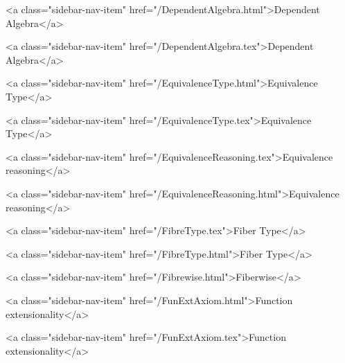       
    
      
        
          <a class="sidebar-nav-item" href="/DependentAlgebra.html">Dependent Algebra</a>
        
      
    
      
        
          <a class="sidebar-nav-item" href="/DependentAlgebra.tex">Dependent Algebra</a>
        
      
    
      
        
          <a class="sidebar-nav-item" href="/EquivalenceType.html">Equivalence Type</a>
        
      
    
      
        
          <a class="sidebar-nav-item" href="/EquivalenceType.tex">Equivalence Type</a>
        
      
    
      
        
          <a class="sidebar-nav-item" href="/EquivalenceReasoning.tex">Equivalence reasoning</a>
        
      
    
      
        
          <a class="sidebar-nav-item" href="/EquivalenceReasoning.html">Equivalence reasoning</a>
        
      
    
      
        
          <a class="sidebar-nav-item" href="/FibreType.tex">Fiber Type</a>
        
      
    
      
        
          <a class="sidebar-nav-item" href="/FibreType.html">Fiber Type</a>
        
      
    
      
        
          <a class="sidebar-nav-item" href="/Fibrewise.html">Fiberwise</a>
        
      
    
      
        
          <a class="sidebar-nav-item" href="/FunExtAxiom.html">Function extensionality</a>
        
      
    
      
        
          <a class="sidebar-nav-item" href="/FunExtAxiom.tex">Function extensionality</a>
        
